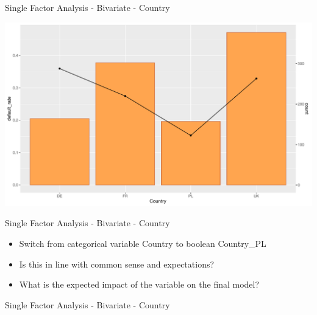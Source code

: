\documentclass[9pt,ignorenonframetext,]{beamer}
\newenvironment{Shaded}{\begin{snugshade}}{\end{snugshade}}
\newcommand{\DecValTok}[1]{\textcolor[rgb]{0.00,0.00,0.81}{#1}}
\newcommand{\StringTok}[1]{\textcolor[rgb]{0.31,0.60,0.02}{#1}}
\newcommand{\OperatorTok}[1]{\textcolor[rgb]{0.81,0.36,0.00}{\textbf{#1}}}
\newcommand{\NormalTok}[1]{#1}
\providecommand{\tightlist}{%
  \setlength{\itemsep}{0pt}\setlength{\parskip}{0pt}}
\begin{document}
\begin{frame}{Single Factor Analysis - Bivariate - Country}

\includegraphics{Risk-Models-Development-Process_files/figure-beamer/unnamed-chunk-13-1.pdf}

\end{frame}

\begin{frame}{Single Factor Analysis - Bivariate - Country}

\begin{itemize}
\tightlist
\item
  Switch from categorical variable Country to boolean Country\_PL
\item
  Is this in line with common sense and expectations?
\item
  What is the expected impact of the variable on the final model?
\end{itemize}

\end{frame}

\begin{frame}[fragile]{Single Factor Analysis - Bivariate - Country}

\begin{Shaded}
\end{Shaded}

\end{frame}
\end{document}
